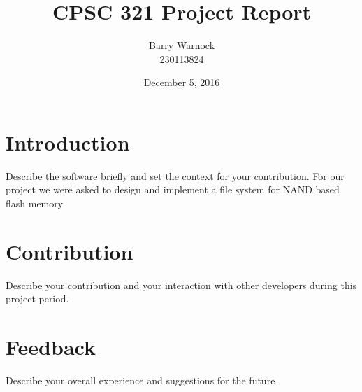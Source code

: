 \documentclass{article}
\begin{document}
\title{CPSC 321 Project Report}
\author{Barry Warnock\\
  230113824}
\date{December 5, 2016}
\maketitle


\section*{Introduction}
Describe the software briefly and set the context for your contribution.
For our project we were asked to design and implement a file system for NAND based flash memory

\section*{Contribution}
Describe your contribution and your interaction with other developers
during this project period.

\section*{Feedback}
Describe your overall experience and suggestions for the future
\end{document}
